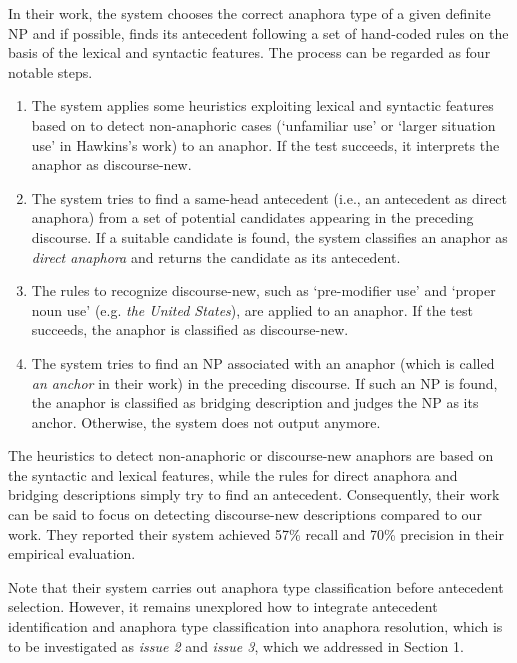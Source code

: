 \documentclass[english]{jnlp_1.4}
\begin{document}
In their work, the system chooses the correct anaphora type of a given
definite NP and if possible, finds its antecedent following a set
of hand-coded rules on the basis of the lexical and syntactic
features. The process can be regarded as four notable steps.

\begin{enumerate}
\renewcommand{\labelenumi}{}
\item The system applies some heuristics exploiting lexical and
  syntactic features based on  to detect
  non-anaphoric cases (`unfamiliar use' or `larger situation use'
      in Hawkins's work) to an anaphor. If the test
  succeeds, it interprets the anaphor as discourse-new.
\item The system tries to find a same-head antecedent (i.e., an
  antecedent as direct anaphora) from a set of potential candidates
  appearing in the preceding discourse. If a suitable candidate is
  found, the system classifies an anaphor as \emph{direct anaphora}
  and returns the candidate as its antecedent.
\item The rules to recognize discourse-new, such as `pre-modifier use'
  and `proper noun use' (e.g. \emph{the United States}), are applied
  to an anaphor. If the test succeeds, the anaphor is classified as
  discourse-new.
\item The system tries to find an NP associated with an anaphor (which
  is called \emph{an anchor} in their work) in the preceding
  discourse. If such an NP is found, the anaphor is classified as
  bridging description and judges the NP as its anchor. Otherwise, the
  system does not output anymore.
\end{enumerate}

The heuristics to detect non-anaphoric or discourse-new anaphors are
based on the syntactic and lexical features, while the rules for
direct anaphora and bridging descriptions simply try to find an
antecedent. Consequently, their work can be said to focus on
detecting discourse-new descriptions compared to our work. They
reported their system achieved 57\% recall and 70\% precision in their
empirical evaluation.


Note that their system carries out anaphora type classification before
antecedent selection. However, it remains unexplored how to integrate
antecedent identification and anaphora type classification into
anaphora resolution, which is to be investigated as \emph{issue 2}
and \emph{issue 3}, which we addressed in Section 1.
\end{document}
